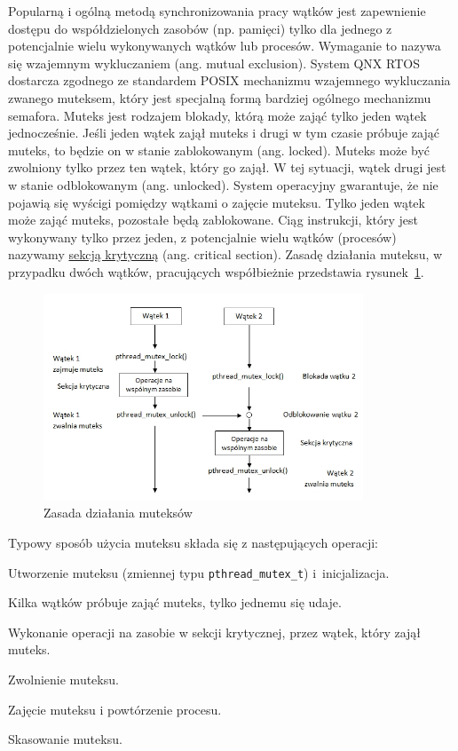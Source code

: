 Popularną i ogólną metodą synchronizowania pracy wątków jest zapewnienie dostępu do współdzielonych zasobów (np. pamięci) tylko dla jednego z potencjalnie wielu wykonywanych wątków lub procesów. Wymaganie to nazywa się wzajemnym wykluczaniem (ang. mutual exclusion). System QNX RTOS dostarcza zgodnego ze standardem POSIX mechanizmu wzajemnego wykluczania zwanego muteksem, który jest specjalną formą bardziej ogólnego mechanizmu semafora. Muteks jest rodzajem blokady, którą może zająć tylko jeden wątek jednocześnie. Jeśli jeden wątek zajął muteks i drugi w tym czasie próbuje zająć muteks, to będzie on w stanie zablokowanym (ang. locked). Muteks może być zwolniony tylko przez ten wątek, który go zajął. W tej sytuacji, wątek drugi jest w stanie odblokowanym (ang. unlocked). System operacyjny gwarantuje, że nie pojawią się wyścigi pomiędzy wątkami o zajęcie muteksu. Tylko jeden wątek może zająć muteks, pozostałe będą zablokowane. Ciąg instrukcji, który jest wykonywany tylko przez jeden, z potencjalnie wielu wątków (procesów) nazywamy \underline{sekcją krytyczną} (ang. critical section). Zasadę działania muteksu, w przypadku dwóch wątków, pracujących współbieżnie przedstawia rysunek~\ref{fig:mutex}.

\begin{figure}[!h]
\centering
\includegraphics[width=0.85\textwidth]{img/mutex}
\caption{Zasada działania muteksów}
\label{fig:mutex}
\end{figure}

Typowy sposób użycia muteksu składa się z następujących operacji:

\begin{myenumerate}
\item Utworzenie muteksu (zmiennej typu \lstinline[style=MyCStyle]{pthread_mutex_t}) i~inicjalizacja.
\item Kilka wątków próbuje zająć muteks, tylko jednemu się udaje.
\item Wykonanie operacji na zasobie w sekcji krytycznej, przez wątek, który zajął muteks.
\item Zwolnienie muteksu.
\item Zajęcie muteksu i powtórzenie procesu.
\item Skasowanie muteksu.
\end{myenumerate}

